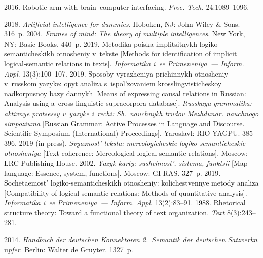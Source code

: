 \begin{multicols}{2}
{{\begin{thebibliography}{99}
 2016. Robotic arm with brain--computer interfacing. \textit{Proc. 
Tech.} 24:1089--1096.

 2018. \textit{Artificial intelligence for 
dummies.} Hoboken, NJ: John Wiley \& Sons. 316~p.
 2004. \textit{Frames of mind: The theory of multiple 
intelligences}. New York, NY: Basic Books. 440~p.
 2019. Metodika poiska implitsitnykh  
logiko-semanticheskikh otnosheniy v~tekste [Methods for identification of implicit 
logical-semantic relations in texts]. \textit{Informatika i~ee Primeneniya~--- Inform. 
Appl}. 13(3):100--107.
 2019. Sposoby vyrazheniya prichinnykh 
otnosheniy v~russkom yazyke: opyt ana\-li\-za s~ispol'zovaniem krosslingvisticheskoy 
nadkorpusnoy bazy dannykh [Means of expressing causal relations in Russian: 
Analysis using a~cross-linguistic supracorpora database]. \textit{Russkaya 
grammatika: aktivnye protsessy v~yazyke i~rechi: Sb.\ nauchnykh trudov 
Mezhdunar. nauchnogo simpoziuma} [Russian Grammar: Active Processes in Language and Discourse.  
Scientific Symposium (International) Proceedings]. Yaroslavl: RIO YAGPU.  
385--396.
 2019 (in press). \textit{Svyaznost' teksta: 
mereologicheskie logiko-semanticheskie  otnosheniya}
[Text coherence: Mereological logical semantic relations]. Moscow: LRC Publishing House.  
 2002. \textit{Yazyk karty: sushchnost', sistema, funktsii} [Map 
language: Essence, system, functions]. Moscow: GI RAS. 327~p.
 2019. So\-che\-ta\-emost'  
logiko-semanticheskikh otnosheniy: kolichestvennye metody analiza [Compatibility 
of logical semantic relations: Methods of quantitative analysis]. \textit{Informatika 
i~ee Primeneniya~--- Inform. Appl}. 13(2):83--91.
 1988. Rhetorical structure theory: 
Toward a functional theory of text organization. \textit{Text}
8(3):243--281.

 2014. 
\textit{Handbuch der deutschen Konnektoren 2.~Semantik der deutschen 
Satzverkn$\ddot{\mbox{u}}$pfer}. Berlin: Walter de Gruyter. 1327~p.


\end{thebibliography}}}
\end{multicols}
